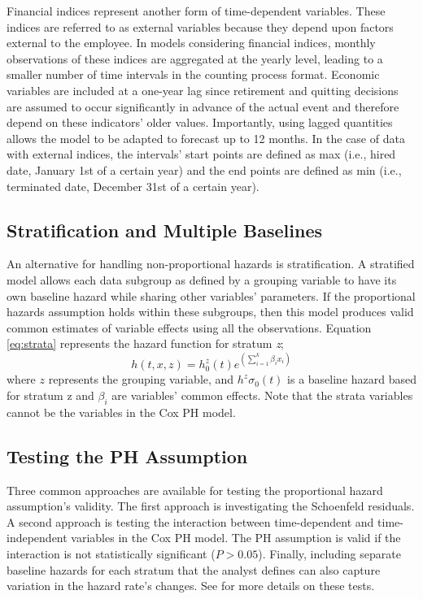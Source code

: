 Financial indices represent another form of time-dependent variables. These indices are referred to as external variables because they depend upon factors external to the employee. In models considering financial indices, monthly observations of these indices are aggregated at the yearly level, leading to a smaller number of time intervals in the counting process format.  Economic variables are included at a one-year lag since retirement and quitting decisions are assumed to occur significantly in advance of the actual event and therefore depend on these indicators' older values. Importantly, using lagged quantities allows the model to be adapted to forecast up to 12 months. In the case of data with external indices, the intervals' start points are defined as max (i.e., hired date, January 1st of a certain year) and the end points are defined as min (i.e., terminated date, December 31st of a certain year).
\subsection{Stratification and Multiple Baselines}
An alternative for handling non-proportional hazards is stratification. A stratified model allows each data subgroup as defined by a grouping variable to have its own baseline hazard while sharing other variables' parameters. If the proportional hazards assumption holds within these subgroups, then this model produces valid common estimates of variable effects using all the observations. Equation \ref{eq:strata} represents the hazard function for stratum {\it z};
\begin{equation}
\label{eq:strata}
h(t,x,z)=h^z_0(t)e^{(\sum_{i=1}^{k}\beta_ix_i)}
\end{equation}
where $z$ represents the grouping variable, and $h^z\sigma_0(t)$ is a baseline hazard based for stratum z and $\beta_i$ are variables' common effects. Note that the strata variables cannot be the variables in the Cox PH model.
\subsection{Testing the PH Assumption}
Three common approaches are available for testing the proportional hazard assumption's validity. The first approach is investigating the Schoenfeld residuals. A second approach is testing the interaction between time-dependent and time-independent variables in the Cox PH model. The PH assumption is valid if the interaction is not statistically significant ($P>0.05$). Finally, including separate baseline hazards for each stratum that the analyst defines can also capture variation in the hazard rate's changes. See \citet{allison2010,collett2015} for more details on these tests.

